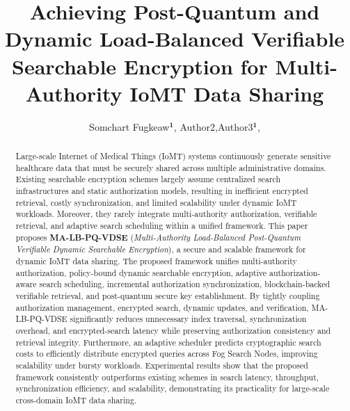 \documentclass{ieeetj}
\theoremstyle{ieee-style}
\def\authorrefmark#1{\ensuremath{^{\textbf{#1}}}}
\begin{document}


\title{{Achieving Post-Quantum and Dynamic Load-Balanced Verifiable Searchable Encryption for Multi-Authority IoMT Data Sharing}}

\author{
Somchart Fugkeaw\authorrefmark{1},
Author2,Author3\authorrefmark{1},\\
}






\begin{abstract}
Large-scale Internet of Medical Things (IoMT) systems continuously generate sensitive healthcare data that must be securely shared across multiple administrative domains. Existing searchable encryption schemes largely assume centralized search infrastructures and static authorization models, resulting in inefficient encrypted retrieval, costly synchronization, and limited scalability under dynamic IoMT workloads. Moreover, they rarely integrate multi-authority authorization, verifiable retrieval, and adaptive search scheduling within a unified framework. This paper proposes \textbf{MA-LB-PQ-VDSE} (\emph{Multi-Authority Load-Balanced Post-Quantum Verifiable Dynamic Searchable Encryption}), a secure and scalable framework for dynamic IoMT data sharing. The proposed framework unifies multi-authority authorization, policy-bound dynamic searchable encryption, adaptive authorization-aware search scheduling, incremental authorization synchronization, blockchain-backed verifiable retrieval, and post-quantum secure key establishment. By tightly coupling authorization management, encrypted search, dynamic updates, and verification, MA-LB-PQ-VDSE significantly reduces unnecessary index traversal, synchronization overhead, and encrypted-search latency while preserving authorization consistency and retrieval integrity. Furthermore, an adaptive scheduler predicts cryptographic search costs to efficiently distribute encrypted queries across Fog Search Nodes, improving scalability under bursty workloads. Experimental results show that the proposed framework consistently outperforms existing schemes in search latency, throughput, synchronization efficiency, and scalability, demonstrating its practicality for large-scale cross-domain IoMT data sharing.
\end{abstract}
\end{document}
